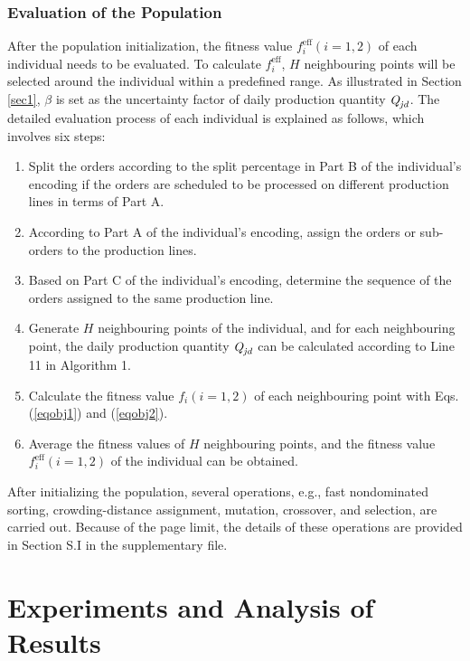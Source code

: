 \documentclass[journal]{IEEEtran}
\theoremstyle{definition}
\begin{document}
\subsubsection{Evaluation of the Population}
After the population initialization, the fitness value $f_i^{\textrm{eff}}(i=1, 2)$ of each individual needs to be evaluated. To calculate $f_i^{\textrm{eff}}$, $H$ neighbouring points will be selected around the individual within a predefined range. As illustrated in Section \ref{sec1}, $\beta$ is set as the uncertainty factor of daily production quantity $\emph{Q}_\emph{jd}$. The detailed evaluation process of each individual is explained as follows, which involves six steps:

\begin{enumerate}[Step 1.]
\item Split the orders according to the split percentage in Part B of the individual's encoding if the orders are scheduled to be processed on different production lines in terms of Part A.
\item According to Part A of the individual's encoding, assign the orders or sub-orders to the production lines.
\item Based on Part C of the individual's encoding, determine the sequence of the orders assigned to the same production line.
\item Generate $H$ neighbouring points of the individual, and for each neighbouring point, the daily production quantity $\emph{Q}_\emph{jd}$ can be calculated according to Line 11 in Algorithm 1.
\item Calculate the fitness value $f_i(i=1, 2)$ of each neighbouring point with Eqs. (\ref{eqobj1}) and (\ref{eqobj2}).
\item Average the fitness values of $H$ neighbouring points, and the fitness value $f_i^{\textrm{eff}}(i=1, 2)$ of the individual can be obtained.
\end{enumerate}

After initializing the population, several operations, e.g., fast nondominated sorting, crowding-distance assignment, mutation, crossover, and selection, are carried out. Because of the page limit, the details of these operations are provided in Section S.I in the supplementary file.

\section{Experiments and Analysis of Results}
\end{document}
